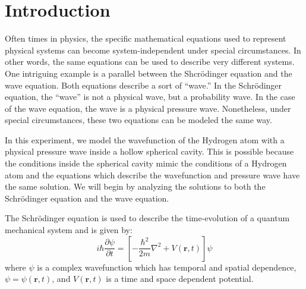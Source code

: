 \documentclass[12pt]{article}
\renewcommand{\vec}[1]{\mathbf{#1}} %
\newcommand{\ppnd}[2]{\frac{\partial #1}{\partial #2}}
\newcommand{\lap}{\nabla^2}
\begin{document}
\section{Introduction}
Often times in physics, the specific mathematical equations used to represent physical systems can become system-independent under special circumstances. In other words, the same equations can be used to describe very different systems. One intriguing example is a parallel between the Shcr\"odinger equation and the wave equation. Both equations describe a sort of ``wave.'' In the Schr\"odinger equation, the ``wave'' is not a physical wave, but a probability wave. In the case of the wave equation, the wave is a physical pressure wave. Nonetheless, under special circumstances, these two equations can be modeled the same way.

In this experiment, we model the wavefunction of the Hydrogen atom with a physical pressure wave inside a hollow spherical cavity. This is possible because the conditions inside the spherical cavity mimic the conditions of a Hydrogen atom and the equations which describe the wavefunction and pressure wave have the same solution. We will begin by analyzing the solutions to both the Schr\"odinger equation and the wave equation.


\hrulefill

The Schr\"odinger equation is used to describe the time-evolution of a quantum mechanical system and is given by:
\begin{equation}
\label{schrodingerEqn1}
	i\hbar\ppnd{\psi}{t} = \left[-\frac{\hbar^2}{2m}\lap+ V(\vec{r},t)\right] \psi
\end{equation}
where $\psi$ is a complex wavefunction which has temporal and spatial dependence, $\psi = \psi{(\vec{r},t)}$, and $V(\vec{r},t)$ is a time and space dependent potential.
\end{document}
